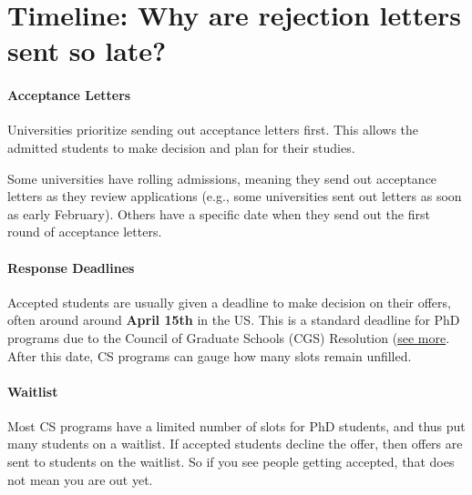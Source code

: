 \documentclass[oneside,11pt,dvipsnames]{book}
\begin{document}
\section{Timeline: Why are rejection letters sent so late?}\label{sec:late-rejection}


\paragraph{Acceptance Letters} Universities prioritize sending out acceptance letters first. This allows the admitted students to make decision and plan for their studies.

Some universities have rolling admissions, meaning they send out acceptance letters as they review applications (e.g., some universities sent out letters as soon as early February). Others have a specific date when they send out the first round of acceptance letters.   

\paragraph{Response Deadlines} Accepted students are usually given a deadline to make decision on their offers, often around around \textbf{April 15th} in the US. This is a standard deadline for PhD programs due to the Council of Graduate Schools (CGS) Resolution (\href{https://cgsnet.org/wp-content/uploads/2024/01/CGS_April15_Resolution_Jan312024.pdf}{see more}. After this date, CS programs can gauge how many slots remain unfilled.

\paragraph{Waitlist} Most CS programs have a limited number of slots for PhD students, and thus put many students on a waitlist.  If accepted students decline the offer, then offers are sent to students on the waitlist. So if you see people getting accepted, that does not mean you are out yet.
\end{document}
